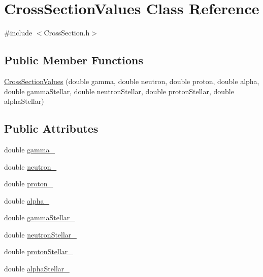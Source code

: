 \hypertarget{classCrossSectionValues}{\section{Cross\-Section\-Values Class Reference}
\label{classCrossSectionValues}
}


{\ttfamily \#include $<$Cross\-Section.\-h$>$}

\subsection*{Public Member Functions}
\begin{DoxyCompactItemize}
\item 
\hyperlink{classCrossSectionValues_ac2da214ae52c700d107ef859dc840e21}{Cross\-Section\-Values} (double gamma, double neutron, double proton, double alpha, double gamma\-Stellar, double neutron\-Stellar, double proton\-Stellar, double alpha\-Stellar)
\end{DoxyCompactItemize}
\subsection*{Public Attributes}
\begin{DoxyCompactItemize}
\item 
double \hyperlink{classCrossSectionValues_a4d7e9f4cba2e23d96e87986839f28168}{gamma\-\_\-}
\item 
double \hyperlink{classCrossSectionValues_a2d27c6bad11726cd2a93aba6d68e65ff}{neutron\-\_\-}
\item 
double \hyperlink{classCrossSectionValues_a67b8cc02e343363b59fbd03c453f3414}{proton\-\_\-}
\item 
double \hyperlink{classCrossSectionValues_a1aab957845bc0b525f92b54d990628cd}{alpha\-\_\-}
\item 
double \hyperlink{classCrossSectionValues_a7e1ceba8c71d2b42a2548a07250a0b21}{gamma\-Stellar\-\_\-}
\item 
double \hyperlink{classCrossSectionValues_a98880642976f3151a1db303a844f6ea5}{neutron\-Stellar\-\_\-}
\item 
double \hyperlink{classCrossSectionValues_a397ce725fd6c8f5f3c92422a811a79fd}{proton\-Stellar\-\_\-}
\item 
double \hyperlink{classCrossSectionValues_a8711dc17e55f65769289ba502f5470f6}{alpha\-Stellar\-\_\-}
\end{DoxyCompactItemize}


